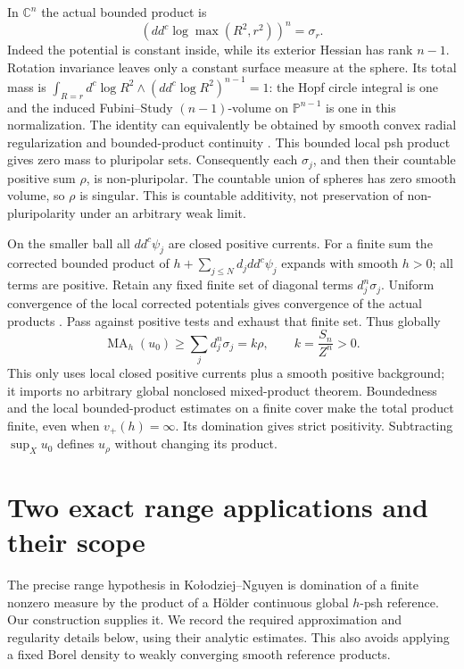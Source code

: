 \documentclass[11pt]{article}
\newcommand{\ddc}{dd^c}
\newcommand{\MA}{\operatorname{MA}}
\begin{document}
In $\mathbb C^n$ the actual bounded product is
\begin{equation}\label{eq:sphere}
 (\ddc\log\max(R^2,r^2))^n=\sigma_r.
\end{equation}
Indeed the potential is constant inside, while its exterior Hessian
has rank $n-1$. Rotation invariance leaves only a constant surface
measure at the sphere. Its total mass is
$\int_{R=r}d^c\log R^2\wedge(\ddc\log R^2)^{n-1}=1$:
the Hopf circle integral is one and the induced Fubini--Study
$(n-1)$-volume on $\mathbb P^{n-1}$ is one in this normalization.
The identity can equivalently be obtained by smooth convex radial
regularization and bounded-product continuity \cite{BT}.
This bounded local psh product gives zero mass to pluripolar sets.
Consequently each $\sigma_j$, and then their countable positive sum
$\rho$, is non-pluripolar. The countable union of spheres has zero
smooth volume, so $\rho$ is singular. This is countable additivity,
not preservation of non-pluripolarity under an arbitrary weak limit.

On the smaller ball all $\ddc\psi_j$ are closed positive currents.
For a finite sum the corrected bounded product of
$h+\sum_{j\leq N}d_j\ddc\psi_j$ expands with smooth $h>0$;
all terms are positive. Retain any fixed finite set of diagonal terms
$d_j^n\sigma_j$. Uniform convergence of the local corrected potentials
gives convergence of the actual products \cite{BT}. Pass against
positive tests and exhaust that finite set. Thus globally
\[
 \MA_h(u_0)\geq\sum_jd_j^n\sigma_j=k\rho,
 \qquad k=\frac{S_n}{Z^n}>0.
\]
This only uses local closed positive currents plus a smooth positive
background; it imports no arbitrary global nonclosed mixed-product
theorem. Boundedness and the local bounded-product estimates on a finite
cover make the total product finite, even when $v_+(h)=\infty$.
Its domination gives strict positivity. Subtracting $\sup_Xu_0$
defines $u_\rho$ without changing its product.

\section{Two exact range applications and their scope}
The precise range hypothesis in Ko\l odziej--Nguyen
\cite[Definition 1.1 and Theorem 1.3]{KN} is domination of a finite
nonzero measure by the product of a H\"older continuous global
$h$-psh reference. Our construction supplies it. We record the required
approximation and regularity details below, using their analytic estimates.
This also avoids applying a fixed Borel density to weakly converging
smooth reference products.
\end{document}
